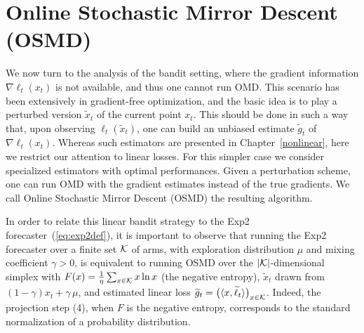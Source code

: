 \section{Online Stochastic Mirror Descent (OSMD)} \label{sec:OSMD}
We now turn to the analysis of the bandit setting, where the gradient information $\nabla \ell_t(x_t)$ is not available, and thus one cannot run OMD. This scenario has been extensively in gradient-free optimization, and the basic idea is to play a perturbed version $\tilde{x}_t$ of the current point $x_t$. This should be done in such a way that, upon observing $\ell_t(\tilde{x}_t)$, one can build an unbiased estimate $\tilde{g}_t$ of $\nabla \ell_t(x_t)$. Whereas such estimators are presented in Chapter~\ref{nonlinear}, here we restrict our attention to linear losses. For this simpler case we consider specialized estimators with optimal performances.
%
Given a perturbation scheme, one can run OMD with the gradient estimates instead of the true gradients. We call Online Stochastic Mirror Descent (OSMD) the resulting algorithm.
%

In order to relate this linear bandit strategy to the Exp2 forecaster~(\ref{eq:exp2def}), it is important to observe that running the Exp2 forecaster over a finite set $\mathcal{K}$ of arms, with exploration distribution $\mu$ and mixing coefficient $\gamma > 0$, is equivalent to running OSMD over the $|\mathcal{K}|$-dimensional simplex with $F(x) = \tfrac{1}{\eta}\sum_{x\in\mathcal{K}} x\ln x$ (the negative entropy), $\tilde{x}_t$ drawn from $(1-\gamma)x_t + \gamma\,\mu$, and estimated linear loss $\widetilde{g}_t = \bigl(\langle x, \widetilde{\ell}_t \rangle\bigr)_{x\in\mathcal{K}}$. Indeed, the projection step (4), when $F$ is the negative entropy, corresponds to the standard normalization of a probability distribution.

